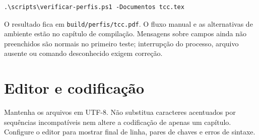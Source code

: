 \begin{lstlisting}
.\scripts\verificar-perfis.ps1 -Documentos tcc.tex
\end{lstlisting}

O resultado fica em \texttt{build/perfis/tcc.pdf}. O fluxo manual e as alternativas de ambiente estão no capítulo de compilação. Mensagens sobre campos ainda não preenchidos são normais no primeiro teste; interrupção do processo, arquivo ausente ou comando desconhecido exigem correção.

\section{Editor e codificação}

Mantenha os arquivos em UTF-8. Não substitua caracteres acentuados por sequências incompatíveis nem altere a codificação de apenas um capítulo. Configure o editor para mostrar final de linha, pares de chaves e erros de sintaxe.

